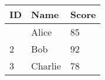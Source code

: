 \begin{longtable}[]{@{}lll@{}}
\toprule\noalign{}
ID & Name & Score \\
\midrule\noalign{}
\endhead
\bottomrule\noalign{}
\endlastfoot
1 & Alice & 85 \\
2 & Bob & 92 \\
3 & Charlie & 78 \\
\end{longtable}
